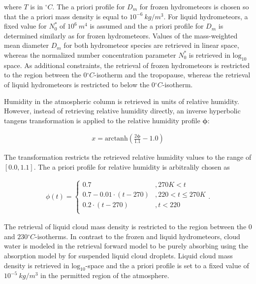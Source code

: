 \documentclass[journal abbreviation, manuscript]{copernicus}
\begin{document}
where $T$ is in $\unit{^\circ C}$. The a priori profile for $D_m$ for frozen
hydrometeors is chosen so that the a priori mass density is equal to
$10^{-6}\ \unit{kg/m^3}$. For liquid hydrometeors, a
fixed value for $N_0^*$ of $10^6\ \unit{m^4}$ is assumed and the
a priori profile for $D_m$ is determined similarly as for frozen
hydrometeors. Values of the mass-weighted mean diameter $D_m$ for both
hydrometeor species are retrieved in linear space, whereas the normalized
number concentration parameter $N_0^*$ is retrieved in $\text{log}_{10}$
space. As additional constraints, the retrieval of frozen hydrometeors is
restricted to the region between the $0 \unit{^\circ C}$-isotherm and
the tropopause, whereas the retrieval of liquid hydrometeors is restricted 
to below the $0\unit{^\circ C}$-isotherm.

Humidity in the atmospheric column is retrieved in units of relative humidity.
However, instead of retrieving relative humidity directly, an inverse hyperbolic
tangens transformation is applied to the relative humidity profile $\mathbf{\phi}$:

\begin{align}
x = \text{arctanh}(\frac{2 \mathbf{\phi}}{1.1} - 1.0)
\end{align}

The transformation restricts the retrieved relative humidity values to
the range of $[0.0, 1.1]$. The a priori profile for relative humidity
is arbitralily chosen as

\begin{align}
\phi(t) = \begin{cases}
 0.7 &, 270\unit{K} < t \\
 0.7 - 0.01 \cdot (t - 270) & ,220 < t \leq  270\unit{K} \\
 0.2 \cdot (t - 270) & ,t < 220 \\
 \end{cases}.
\end{align}

The retrieval of liquid cloud mass density is restricted to the region
between the $0$ and $230\unit{^\circ C}$-isotherms. In contrast to the
frozen and liquid hydrometeors, cloud water is modeled in the retrieval
forward model to be purely absorbing using the absorption model by
\cite{liebe92} for suspended liquid cloud droplets. Liquid cloud mass density
is retrieved in $\text{log}_{10}$-space and the a priori profile is set to a fixed
value of $10^{-5}\ \unit{kg / m^3}$ in the permitted region of the atmosphere.
\end{document}
